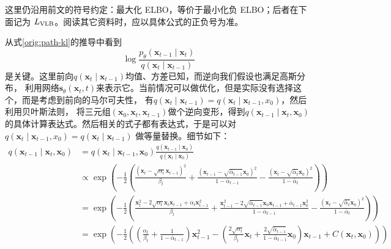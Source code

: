这里仍沿用前文的符号约定：最大化 ELBO，等价于最小化负 ELBO；后者在下面记为 $L_{\rm VLB}$。阅读其它资料时，应以具体公式的正负号为准。

从式\eqref{orig:path-kl}的推导中看到
\begin{equation}
\log \frac{p_\theta\left(\mathbf{x}_{t-1} \mid \mathbf{x}_t\right)}{q\left(\mathbf{x}_t \mid \mathbf{x}_{t-1}\right)}
\end{equation}
是关键。这里前向$q(\mathbf{x}_t \mid \mathbf{x}_{t-1})$均值、方差已知，而逆向我们假设也满足高斯分布，
利用网络$\mathbf{s}_\theta(\mathbf{x}_t, t)$来表示它。当前情况可以做优化，但是实际没有选择这个，而是考虑到前向的马尔可夫性，
有$q(\mathbf{x}_t \mid \mathbf{x}_{t-1})=q(\mathbf{x}_t \mid \mathbf{x}_{t-1}, x_0)$，然后利用贝叶斯法则，
将三元组$(\mathbf{x}_0, \mathbf{x}_t, \mathbf{x}_{t-1})$做个逆向变形，得到$q(\mathbf{x}_{t-1} \mid \mathbf{x}_t,\mathbf{x}_0)$
的具体计算表达式。然后相关的式子都有表达式，于是可以对$q(\mathbf{x}_t \mid \mathbf{x}_{t-1}, x_0)=q(\mathbf{x}_t \mid \mathbf{x}_{t-1})$
做等量替换。细节如下：
\begin{equation}
\begin{aligned}
q\left(\mathbf{x}_{t-1} \mid \mathbf{x}_t, \mathbf{x}_0\right) & =q\left(\mathbf{x}_t \mid \mathbf{x}_{t-1}, \mathbf{x}_0\right) \frac{q\left(\mathbf{x}_{t-1} \mid \mathbf{x}_0\right)}{q\left(\mathbf{x}_t \mid \mathbf{x}_0\right)} \\
& \propto \exp \left(-\frac{1}{2}\left(\frac{\left(\mathbf{x}_t-\sqrt{\alpha_t} \mathbf{x}_{t-1}\right)^2}{\beta_t}+\frac{\left(\mathbf{x}_{t-1}-\sqrt{\bar{\alpha}_{t-1}} \mathbf{x}_0\right)^2}{1-\bar{\alpha}_{t-1}}-\frac{\left(\mathbf{x}_t-\sqrt{\bar{\alpha}_t} \mathbf{x}_0\right)^2}{1-\bar{\alpha}_t}\right)\right) \\
& =\exp \left(-\frac{1}{2}\left(\frac{\mathbf{x}_t^2-2 \sqrt{\alpha_t} \mathbf{x}_t \mathbf{x}_{t-1}+\alpha_t \mathbf{x}_{t-1}^2}{\beta_t}+\frac{\mathbf{x}_{t-1}^2-2 \sqrt{\bar{\alpha}_{t-1}} \mathbf{x}_0 \mathbf{x}_{t-1}+\bar{\alpha}_{t-1} \mathbf{x}_0^2}{1-\bar{\alpha}_{t-1}}-\frac{\left(\mathbf{x}_t-\sqrt{\bar{\alpha}_t} \mathbf{x}_0\right)^2}{1-\bar{\alpha}_t}\right)\right) \\
& =\exp \left(-\frac{1}{2}\left(\left(\frac{\alpha_t}{\beta_t}+\frac{1}{1-\bar{\alpha}_{t-1}}\right) \mathbf{x}_{t-1}^2-\left(\frac{2 \sqrt{\alpha_t}}{\beta_t} \mathbf{x}_t+\frac{2 \sqrt{\bar{\alpha}_{t-1}}}{1-\bar{\alpha}_{t-1}} \mathbf{x}_0\right) \mathbf{x}_{t-1}+C\left(\mathbf{x}_t, \mathbf{x}_0\right)\right)\right)
\end{aligned}
\end{equation}
